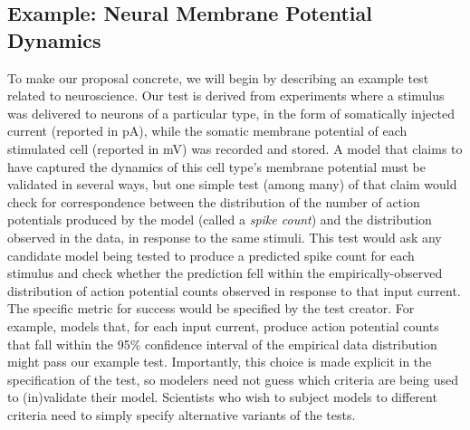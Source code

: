 \documentclass[11pt,letterpaper]{article}
\begin{document}
\subsection{Example: Neural Membrane Potential Dynamics} To make our proposal concrete, we will begin by describing an example test related to  neuroscience. Our test is derived from experiments where a stimulus was delivered to neurons of a particular type, in the form of somatically injected current (reported in pA), while the somatic membrane potential of each stimulated cell (reported in mV) was recorded and stored.  A model that claims to have captured the dynamics of this cell type's membrane potential must be validated in several ways, but one simple test (among many) of that claim would check for correspondence between the distribution of the number of action potentials produced by the model (called a \emph{spike count}) and the distribution observed in the data, in response to the same stimuli. This test would ask any candidate model being tested to produce a predicted spike count for each stimulus and check whether the prediction fell within the empirically-observed distribution of action potential counts observed in response to that input current.  The specific metric for success would be specified by the test creator.  For example, models that, for each input current, produce action potential counts that fall within the 95\% confidence interval of the empirical data distribution might pass our example test. Importantly, this choice is made explicit in the specification of the test, so modelers need not guess which criteria are being used to (in)validate their model. Scientists who wish to subject models to different criteria need to simply specify alternative variants of the tests.
\end{document}
